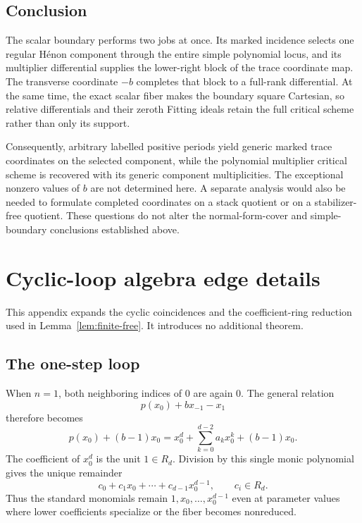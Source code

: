 \documentclass[11pt]{article}
\theoremstyle{definition}
\theoremstyle{remark}
\begin{document}
\subsection{Conclusion}

The scalar boundary performs two jobs at once.  Its marked incidence selects
one regular Hénon component through the entire simple polynomial locus, and
its multiplier differential supplies the lower-right block of the trace
coordinate map.  The transverse coordinate $-b$ completes that block to a
full-rank differential.  At the same time, the exact scalar fiber makes the
boundary square Cartesian, so relative differentials and their zeroth
Fitting ideals retain the full critical scheme rather than only its support.

Consequently, arbitrary labelled positive periods yield generic marked trace
coordinates on the selected component, while the polynomial multiplier
critical scheme is recovered with its generic component multiplicities.
The exceptional nonzero values of $b$ are not determined here.  A separate
analysis would also be needed to formulate completed coordinates on a stack
quotient or on a stabilizer-free quotient.  These questions do not alter the
normal-form-cover and simple-boundary conclusions established above.

\appendix

\section{Cyclic-loop algebra edge details}
\label{sec:appendix}

This appendix expands the cyclic coincidences and the coefficient-ring
reduction used in Lemma~\ref{lem:finite-free}.  It introduces no additional
theorem.

\subsection*{The one-step loop}

When $n=1$, both neighboring indices of $0$ are again $0$.  The general
relation
\[
  p(x_0)+b x_{-1}-x_1
\]
therefore becomes
\[
  p(x_0)+(b-1)x_0
  =
  x_0^d+\sum_{k=0}^{d-2}a_kx_0^k+(b-1)x_0.
\]
The coefficient of $x_0^d$ is the unit $1\in R_d$.  Division by this single
monic polynomial gives the unique remainder
\[
  c_0+c_1x_0+\cdots+c_{d-1}x_0^{d-1},
  \qquad c_i\in R_d.
\]
Thus the standard monomials remain
$1,x_0,\ldots,x_0^{d-1}$ even at parameter values where lower coefficients
specialize or the fiber becomes nonreduced.
\end{document}
